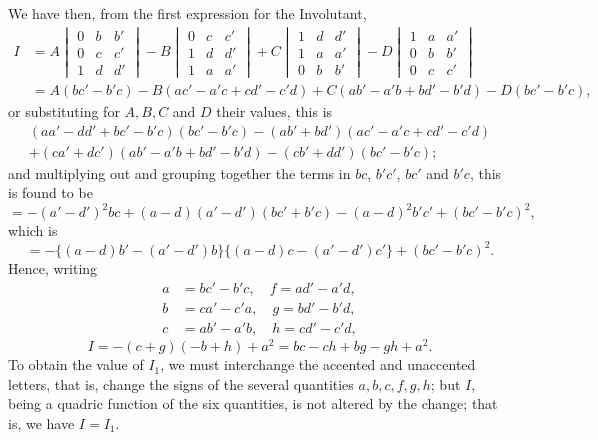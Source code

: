 \documentclass[11pt,a4paper]{book}
\begin{document}
We have then, from the first expression for the Involutant,
\begin{align*}
I &= A \begin{vmatrix} 0 & b & b' \\ 0 & c & c' \\ 1 & d & d' \end{vmatrix}
- B \begin{vmatrix} 0 & c & c' \\ 1 & d & d' \\ 1 & a & a' \end{vmatrix}
+ C \begin{vmatrix} 1 & d & d' \\ 1 & a & a' \\ 0 & b & b' \end{vmatrix}
- D \begin{vmatrix} 1 & a & a' \\ 0 & b & b' \\ 0 & c & c' \end{vmatrix} \\
&= A(bc' - b'c) - B(ac' - a'c + cd' - c'd) + C(ab' - a'b + bd' - b'd) - D(bc' - b'c),
\end{align*}
or substituting for $A, B, C$ and $D$ their values, this is
\begin{multline*}
(aa' - dd' + bc' - b'c)(bc' - b'c) - (ab' + bd')(ac' - a'c + cd' - c'd) \\
+ (ca' + dc')(ab' - a'b + bd' - b'd) - (cb' + dd')(bc' - b'c);
\end{multline*}
and multiplying out and grouping together the terms in $bc$, $b'c'$, $bc'$ and $b'c$, this is found to be
$$
= -(a' - d')^2 bc + (a - d)(a' - d')(bc' + b'c) - (a - d)^2 b'c' + (bc' - b'c)^2,
$$
which is
$$
= -\{(a - d)b' - (a' - d')b\}\{(a - d)c - (a' - d')c'\} + (bc' - b'c)^2.
$$
Hence, writing
\begin{align*}
a &= bc' - b'c, \quad f = ad' - a'd, \\
b &= ca' - c'a, \quad g = bd' - b'd, \\
c &= ab' - a'b, \quad h = cd' - c'd,
\end{align*}
$$
I = -(c + g)(-b + h) + a^2 = bc - ch + bg - gh + a^2.
$$
To obtain the value of $I_1$, we must interchange the accented and unaccented letters, that is, change the signs of the several quantities $a, b, c, f, g, h$; but $I$, being a quadric function of the six quantities, is not altered by the change; that is, we have $I = I_1$.

\newpage
\end{document}
